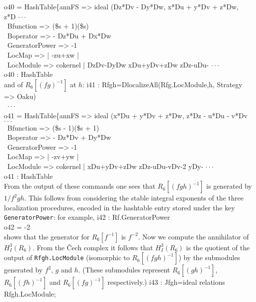 \begin{example}
o40 = HashTable\{annFS => ideal (Dz*Dv - Dy*Dw, x*Du + y*Dv + z*Dw, z*D $\cdot\cdot\cdot$\\
\                Bfunction => (\$s + 1)(\$s)\\
\                Boperator => - Dz*Du + Dx*Dw\\
\                GeneratorPower => -1\\
\                LocMap => | -zu+xw |\\
\                LocModule => cokernel | DzDv-DyDw xDu+yDv+zDw zDz-uDu- $\cdot\cdot\cdot$\\
\emptyLine
o40 : HashTable\\
\endOutput
and of $R_6[(fg)^{-1}]$ at $h$:   
\beginOutput
i41 : Rfgh=DlocalizeAll(Rfg.LocModule,h, Strategy => Oaku)\\
\emptyLine
\                                                                       $\cdot\cdot\cdot$\\
o41 = HashTable\{annFS => ideal (x*Du + y*Dv + z*Dw, z*Dz - u*Du - v*Dv $\cdot\cdot\cdot$\\
\                Bfunction => (\$s - 1)(\$s + 1)\\
\                Boperator => - Dz*Dv + Dy*Dw\\
\                GeneratorPower => -1\\
\                LocMap => | -zv+yw |\\
\                LocModule => cokernel | xDu+yDv+zDw zDz-uDu-vDv-2 yDy- $\cdot\cdot\cdot$\\
\emptyLine
o41 : HashTable\\
\endOutput
From the output of these commands
one sees that $R_6[(fgh)^{-1}]$ is generated by
${1}/{f^2gh}$. This follows from considering the stable integral exponents
of the three localization procedures, 
encoded in the hashtable entry stored under the key {\tt GeneratorPower}:
for example, 
\beginOutput
i42 : Rf.GeneratorPower\\
\emptyLine
o42 = -2\\
\endOutput
shows that the generator for $R_6[f^{-1}]$ is $f^{-2}$.
Now we compute the annihilator of $H^3_I(R_6)$.
From the \v Cech complex it follows that 
 $H^3_I(R_6)$ is the quotient of the output of {\tt Rfgh.LocModule}
 (isomorphic to $R_6[(fgh)^{-1}]$)
by the submodules generated by $f^2$, $g$ and $h$. (These submodules
 represent $R_6[(gh)^{-1}]$, $R_6[(fh)^{-1}]$ and $R_6[(fg)^{-1}]$
 respectively.)  
\beginOutput
i43 : Jfgh=ideal relations Rfgh.LocModule;\\
\emptyLine

\end{example}
